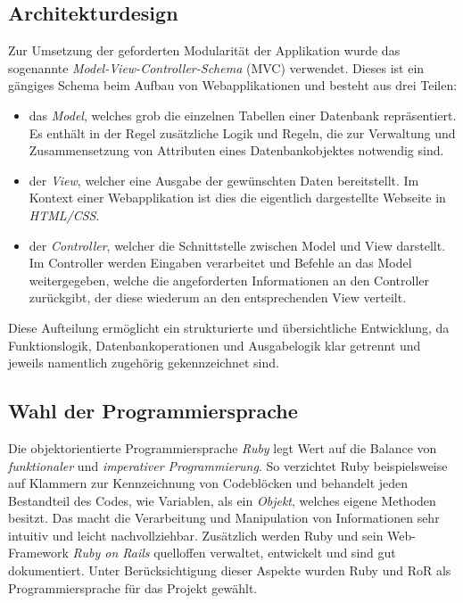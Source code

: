 \subsection{Architekturdesign}
\label{sec:Architekturdesign}
Zur Umsetzung der geforderten Modularität der Applikation wurde das sogenannte
\textit{Model-View-Controller-Schema} (\acs{MVC}) verwendet. Dieses ist ein gängiges Schema beim Aufbau von
Webapplikationen und besteht aus drei Teilen:
\begin{itemize}
	\item das \textit{Model}, welches grob die einzelnen Tabellen einer Datenbank repräsentiert. Es enthält in
	der Regel zusätzliche Logik und Regeln, die zur Verwaltung und Zusammensetzung von Attributen
	eines Datenbankobjektes notwendig sind.
	\item der \textit{View}, welcher eine Ausgabe der gewünschten Daten bereitstellt. Im Kontext einer
	Webapplikation ist dies die eigentlich dargestellte Webseite in \textit{HTML/CSS}.
	\item der \textit{Controller}, welcher die Schnittstelle zwischen Model und View darstellt.
	Im Controller werden Eingaben verarbeitet und Befehle an das Model weitergegeben, welche
	die angeforderten Informationen an den Controller zurückgibt, der diese wiederum an den
	entsprechenden View verteilt.
\end{itemize}
Diese Aufteilung ermöglicht ein strukturierte und übersichtliche Entwicklung, da Funktionslogik,
Datenbankoperationen und Ausgabelogik klar getrennt und jeweils namentlich zugehörig gekennzeichnet
sind.


\subsection{Wahl der Programmiersprache}
\label{sec:Wahl der Programmiersprache}
Die objektorientierte Programmiersprache \textit{Ruby} legt Wert auf die Balance von \textit{funktionaler} und
\textit{imperativer Programmierung}. So verzichtet Ruby beispielsweise auf Klammern zur Kennzeichnung
von Codeblöcken und behandelt jeden Bestandteil des Codes, wie Variablen, als ein \textit{Objekt},
welches eigene Methoden besitzt. Das macht die Verarbeitung und Manipulation von Informationen sehr
intuitiv und leicht nachvollziehbar. Zusätzlich werden Ruby und sein Web-Framework \textit{Ruby on Rails}
quelloffen verwaltet, entwickelt und sind gut dokumentiert. Unter Berücksichtigung dieser Aspekte
wurden Ruby und \acs{RoR} als Programmiersprache für das Projekt gewählt.

